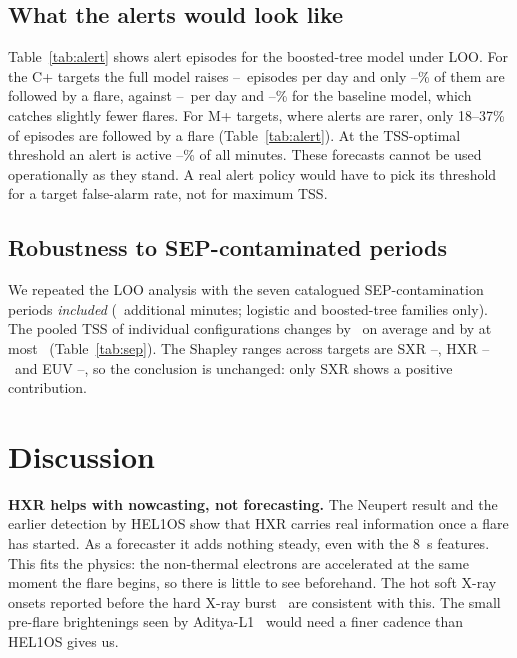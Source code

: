 \documentclass[conference]{IEEEtran}
\begin{document}
\subsection{What the alerts would look like}
Table~\ref{tab:alert} shows alert episodes for the boosted-tree model under LOO. For the C+ targets the full model raises \EpDayFullLo--\EpDayFullHi\ episodes per day and only \EpPrecFullLo--\EpPrecFullHi\% of them are followed by a flare, against \EpDayHistLo--\EpDayHistHi\ per day and \EpPrecHistLo--\EpPrecHistHi\% for the baseline model, which catches slightly fewer flares. For M+ targets, where alerts are rarer, only 18--37\% of episodes are followed by a flare (Table~\ref{tab:alert}). At the TSS-optimal threshold an alert is active \DutyLo--\DutyHi\% of all minutes. These forecasts cannot be used operationally as they stand. A real alert policy would have to pick its threshold for a target false-alarm rate, not for maximum TSS.

\begin{table}[t]
\caption{Alert episodes (boosted trees, leave-one-block-out): episodes per day, share followed by a flare, share of flares preceded by an alert, and share of minutes with an alert active.}
\label{tab:alert}
\centering\footnotesize

\end{table}

\subsection{Robustness to SEP-contaminated periods}
\label{sec:robust}
We repeated the LOO analysis with the seven catalogued SEP-contamination periods \emph{included} (\NumSepMin\ additional minutes; logistic and boosted-tree families only). The pooled TSS of individual configurations changes by \SepMeanAbs\ on average and by at most \SepMaxAbs\ (Table~\ref{tab:sep}). The Shapley ranges across targets are SXR \SepShapLoSXR--\SepShapHiSXR, HXR \SepShapLoHXR--\SepShapHiHXR\ and EUV \SepShapLoEUV--\SepShapHiEUV, so the conclusion is unchanged: only SXR shows a positive contribution.

\begin{table}[t]
\caption{Sensitivity to SEP-contaminated periods: pooled TSS (mean of logistic and boosted-tree families) with the periods excluded (main analysis) or included.}
\label{tab:sep}
\centering\footnotesize

\end{table}

\section{Discussion}
\label{sec:disc}
\textbf{HXR helps with nowcasting, not forecasting.} The Neupert result and the earlier detection by HEL1OS show that HXR carries real information once a flare has started. As a forecaster it adds nothing steady, even with the 8~s features. This fits the physics: the non-thermal electrons are accelerated at the same moment the flare begins, so there is little to see beforehand. The hot soft X-ray onsets reported before the hard X-ray burst~\cite{hudson2021} are consistent with this. The small pre-flare brightenings seen by Aditya-L1~\cite{isro2026} would need a finer cadence than HEL1OS gives us.
\end{document}
